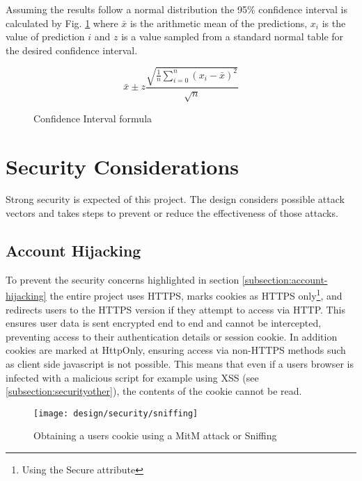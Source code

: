 Assuming the results follow a normal distribution the 95\% confidence interval is calculated by Fig. \ref{fig:confidencelevel} where $\bar{x}$ is the arithmetic mean of the predictions, $x_i$ is the value of prediction $i$ and $z$ is a value sampled from a standard normal table for the desired confidence interval.

\begin{figure}[h]
    \centering
    \[
        \bar{x} \pm z \frac{
                        \sqrt{
                            \frac{1}{n}
                            \sum\limits_{i=0}^{n}{(x_i - \bar{x})^2}
                        }
                       }{\sqrt{n}}
    \]
    \caption[Confidence Interval formula]{Confidence Interval formula}
    \label{fig:confidencelevel}
\end{figure}

\section{Security Considerations} \label{section:security}
Strong security is expected of this project. The design considers possible attack vectors and takes steps to prevent or reduce the effectiveness of those attacks.

\subsection{Account Hijacking}
To prevent the security concerns highlighted in section \ref{subsection:account-hijacking} the entire project uses HTTPS, marks cookies as HTTPS only\footnote{Using the Secure attribute}, and redirects users to the HTTPS version if they attempt to access via HTTP. This ensures user data is sent encrypted end to end and cannot be intercepted, preventing access to their authentication details or session cookie.
%
In addition cookies are marked at HttpOnly, ensuring access via non-HTTPS methods such as client side javascript is not possible. This means that even if a users browser is infected with a malicious script for example using XSS (see \ref{subsection:securityother}), the contents of the cookie cannot be read.

\begin{figure}[h]
    \centering
    \texttt{[image: design/security/sniffing]}
    \caption[Obtaining a users cookie using a MitM attack or sniffing]{Obtaining a users cookie using a MitM attack or Sniffing \parencite{owasp2011sessionhihacking}}
    \label{fig:securitysniffing}
\end{figure}

